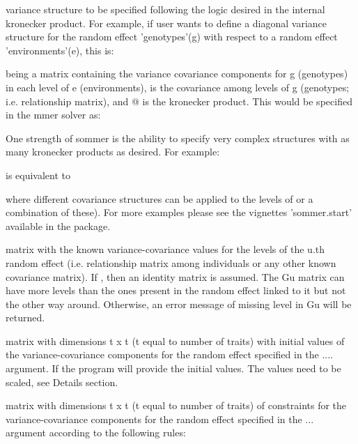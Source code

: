 \documentclass[a4paper]{book}
\begin{document}
\begin{Arguments}
\begin{ldescription}
\item[\code{...}] variance structure to be specified following the logic desired in the internal kronecker product. For example, if user wants to define a diagonal variance structure for the random effect 'genotypes'(g) with respect to a random effect 'environments'(e), this is:


being   a matrix containing the variance covariance components for g (genotypes) in each level of e (environments),  is the covariance among levels of g (genotypes; i.e. relationship matrix), and @ is the kronecker product. This would be specified in the mmer solver as:


One strength of sommer is the ability to specify very complex structures with as many kronecker products as desired. For example:


is equivalent to


where different covariance structures can be applied to the levels of  or a combination of these). For more examples please see the vignettes 'sommer.start' available in the package.

\item[\code{Gu}] matrix with the known variance-covariance values for the levels of the u.th random effect (i.e. relationship matrix among individuals or any other known covariance matrix). If , then an identity matrix is assumed. The Gu matrix can have more levels than the ones present in the random effect linked to it but not the other way around. Otherwise, an error message of missing level in Gu will be returned.

\item[\code{Gti}] matrix with dimensions t x t (t equal to number of traits) with initial values of the variance-covariance components for the random effect specified in the .... argument. If  the program will provide the initial values. The values need to be scaled, see Details section.

\item[\code{Gtc}] matrix with dimensions t x t (t equal to number of traits) of constraints for the variance-covariance components for the random effect specified in the ... argument according to the following rules:


\end{ldescription}
\end{Arguments}
\end{document}

